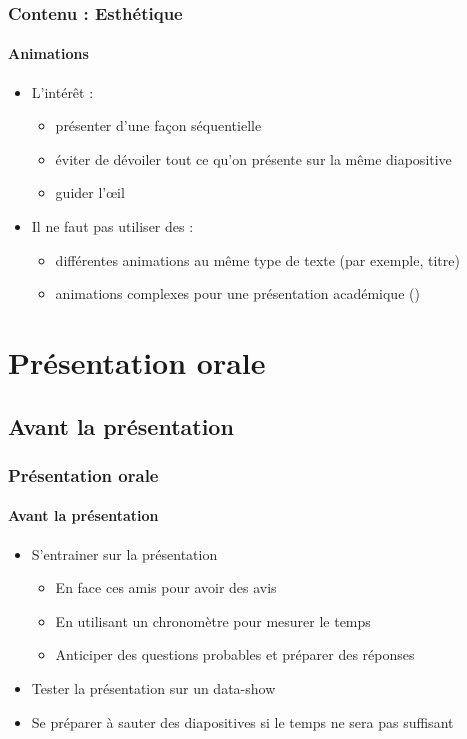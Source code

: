 \documentclass[xcolor=table, usenames,dvipsnames]{beamer}
\begin{document}
\begin{frame}
\frametitle{Contenu : Esthétique}
\framesubtitle{Animations}

\begin{itemize}
	\item L'intérêt : 
	\begin{itemize}
		\item présenter d'une façon séquentielle
		\item éviter de dévoiler tout ce qu'on présente sur la même diapositive
		\item guider l'œil 
	\end{itemize}
		\item Il ne faut pas utiliser des : 
	\begin{itemize}
		\item différentes animations au même type de texte (par exemple, titre)
		\item animations complexes pour une présentation académique ()
	\end{itemize}
\end{itemize}

\end{frame}

\section{Présentation orale}

\subsection{Avant la présentation}

\begin{frame}
\frametitle{Présentation orale}
\framesubtitle{Avant la présentation}

\begin{itemize}
	\item S'entrainer sur la présentation
	\begin{itemize}
		\item En face ces amis pour avoir des avis
		\item En utilisant un chronomètre pour mesurer le temps 
		\item Anticiper des questions probables et préparer des réponses 
	\end{itemize}
	\item Tester la présentation sur un data-show 
	\item Se préparer à sauter des diapositives si le temps ne sera pas suffisant
\end{itemize}

\end{frame}
\end{document}

